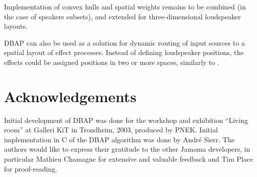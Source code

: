\documentclass[twoside,10pt]{article}
\begin{document}
Implementation of convex hulls and spatial weights remains to be combined (in the case of speakers subsets), and extended for three-dimensional loudspeaker layouts. 


DBAP can also be used as a solution for dynamic routing of input sources to a spatial layout of effect processes. Instead of defining loudspeaker positions, the effects could be assigned positions in two or more spaces, similarly to
\cite{Momeni:2003hipnoscope}. 


\section{Acknowledgements}

Initial development of DBAP was done for the workshop and exhibition ``Living room'' at Galleri KiT in Trondheim, 2003, produced by PNEK. Initial implementation in C of the DBAP algorithm was done by Andr\'e Sierr. The authors would like to express their gratitude to the other Jamoma developers, in particular Mathieu Chamagne for extensive and valuable feedback and Tim Place for proof-reading. 




\end{document}
